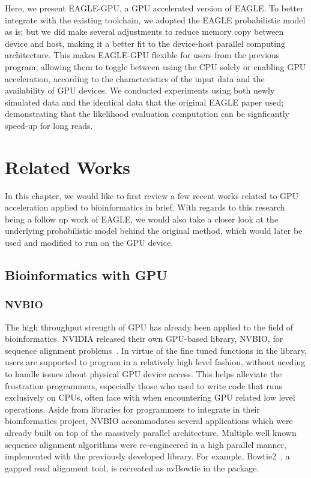 \documentclass{PHlab-thesis}
\begin{document}
Here, we present EAGLE-GPU, a GPU accelerated version of EAGLE.  To better integrate with the existing toolchain, we adopted the EAGLE probabilistic model as is; but we did make several adjustments to reduce memory copy between device and host, making it a better fit to the device-host parallel computing architecture.  This makes EAGLE-GPU flexible for users from the previous program, allowing them to toggle between using the CPU solely or enabling GPU acceleration, according to the characteristics of the input data and the availability of GPU devices.  We conducted experiments using both newly simulated data and the identical data that the original EAGLE paper used; demonstrating that the likelihood evaluation computation can be signficantly speed-up for long reads.

\chapter{Related Works}
In this chapter, we would like to first review a few recent works related to GPU acceleration applied to bioinformatics in brief. With regards to this research being a follow up work of EAGLE, we would also take a closer look at the underlying probabilistic model behind the original method, which would later be used and modified to run on the GPU device.
\section{Bioinformatics with GPU}
\subsection{NVBIO}
The high throughput strength of GPU has already been applied to the field of bioinformatics. NVIDIA released their own GPU-based library, NVBIO, for sequence alignment problems~\cite{nvbio2015}. In virtue of the fine tuned functions in the library, users are supported to program in a relatively high level fashion, without needing to handle issues about physical GPU device access. This helps alleviate the frustration programmers, especially those who used to write code that runs exclusively on CPUs, often face with when encountering GPU related low level operations. Aside from libraries for programmers to integrate in their bioinformatics project, NVBIO accommodates several applications which were already built on top of the massively parallel architecture. Multiple well known sequence alignment algorithms were re-engineered in a high parallel manner, implemented with the previously developed library. For example, Bowtie2~\cite{langmead2012fast}, a gapped read alignment tool, is recreated as nvBowtie in the package.
\end{document}
